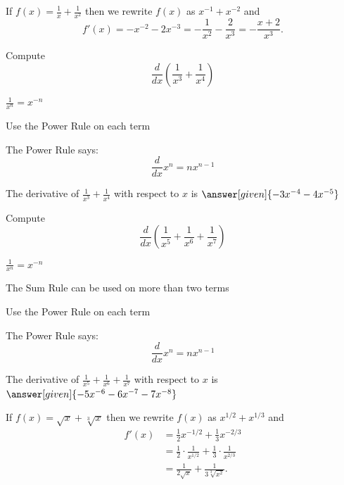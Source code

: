 \documentclass{ximera}
\begin{document}
\begin{example} %
 If $f(x) = \frac{1}{x} + \frac{1}{x^2}$ then we rewrite $f(x)$ as $x^{-1} + x^{-2}$ and 
\[f'(x) = -x^{-2} -2x^{-3} = -\frac{1}{x^2} - \frac{2}{x^3} = - \frac{x + 2}{x^3}.\]
\end{example}

\begin{problem} %
  Compute 
  \[
  \frac{d}{dx} \left(\frac{1}{x^3} + \frac{1}{x^4}\right)
  \]
  
    \begin{hint}
		 $\frac{1}{x^n} = x^{-n}$
		\end{hint}
		\begin{hint}
      Use the Power Rule on each term
    \end{hint}
    \begin{hint}
      The Power Rule says:
      \[
      \frac{d}{dx} x^n = nx^{n-1}
      \]
    \end{hint}    
		The derivative of $\frac{1}{x^3} + \frac{1}{x^4}$ with respect to $x$ is
		 $\answer[given]{-3x^{-4} -4x^{-5}}$
	
\end{problem}


\begin{problem} %
  Compute 
  \[
  \frac{d}{dx} \left(\frac{1}{x^5} + \frac{1}{x^6} + \frac{1}{x^7}\right)
  \]
  
    \begin{hint}
		 $\frac{1}{x^n} = x^{-n}$
		\end{hint}
		\begin{hint}
		  The Sum Rule can be used on more than two terms
		\end{hint}
		\begin{hint}
      Use the Power Rule on each term
    \end{hint}
    \begin{hint}
      The Power Rule says:
      \[
      \frac{d}{dx} x^n = nx^{n-1}
      \]
    \end{hint}    
		The derivative of $\frac{1}{x^5} + \frac{1}{x^6} + \frac{1}{x^7}$ with respect to $x$ is
		 $\answer[given]{-5x^{-6} -6x^{-7} - 7x^{-8}}$
	\
\end{problem}



\begin{example} %
 If $f(x) = \sqrt x + \sqrt[3] x$ then we rewrite $f(x)$ as $x^{1/2} + x^{1/3}$ and
\begin{align*}
f'(x) &= \tfrac12 x^{-1/2} + \tfrac13 x^{-2/3} \\
&= \tfrac12 \cdot \frac{1}{x^{1/2}} + \tfrac13 \cdot \frac{1}{x^{2/3}}\\
&= \frac{1}{2\sqrt x} + \frac{1}{3\sqrt[3] {x^2}}.
\end{align*}
\end{example}
\end{document}
